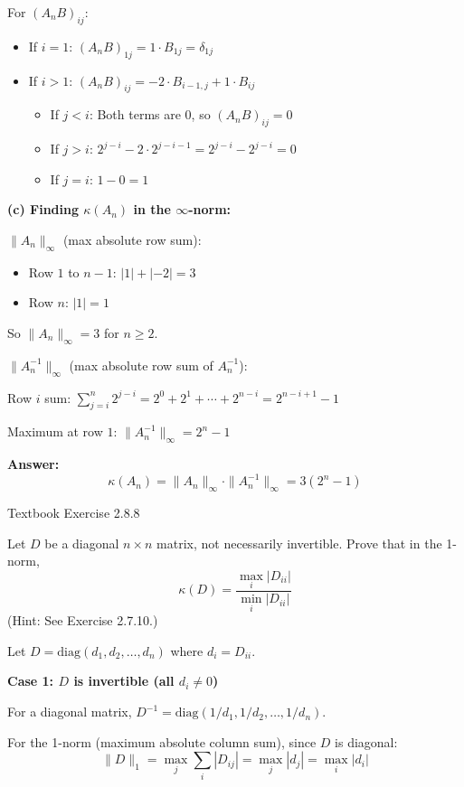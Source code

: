 \documentclass[reqno, answers]{exam}
\begin{document}
\begin{questions}
\begin{solution}
For $(A_n B)_{ij}$:
\begin{itemize}
    \item If $i = 1$: $(A_n B)_{1j} = 1 \cdot B_{1j} = \delta_{1j}$ \checkmark
    \item If $i > 1$: $(A_n B)_{ij} = -2 \cdot B_{i-1,j} + 1 \cdot B_{ij}$
    \begin{itemize}
        \item If $j < i$: Both terms are 0, so $(A_n B)_{ij} = 0$ \checkmark
        \item If $j > i$: $2^{j-i} - 2 \cdot 2^{j-i-1} = 2^{j-i} - 2^{j-i} = 0$ \checkmark
        \item If $j = i$: $1 - 0 = 1$ \checkmark
    \end{itemize}
\end{itemize}

\textbf{(c) Finding $\kappa(A_n)$ in the $\infty$-norm:}

$\|A_n\|_\infty$ (max absolute row sum):
\begin{itemize}
    \item Row $1$ to $n-1$: $|1| + |-2| = 3$
    \item Row $n$: $|1| = 1$
\end{itemize}

So $\|A_n\|_\infty = 3$ for $n \geq 2$.

$\|A_n^{-1}\|_\infty$ (max absolute row sum of $A_n^{-1}$):

Row $i$ sum: $\sum_{j=i}^{n} 2^{j-i} = 2^0 + 2^1 + \cdots + 2^{n-i} = 2^{n-i+1} - 1$

Maximum at row $1$: $\|A_n^{-1}\|_\infty = 2^n - 1$

\textbf{Answer:} 
\[
\boxed{\kappa(A_n) = \|A_n\|_\infty \cdot \|A_n^{-1}\|_\infty = 3(2^n - 1)}
\]
\end{solution}

\question Textbook Exercise 2.8.8

Let $D$ be a diagonal $n \times n$ matrix, not necessarily invertible. Prove that in the 1-norm,
\[
\kappa(D) = \frac{\max_i |D_{ii}|}{\min_i |D_{ii}|}
\]
(Hint: See Exercise 2.7.10.)

\begin{solution}
Let $D = \text{diag}(d_1, d_2, \ldots, d_n)$ where $d_i = D_{ii}$.

\textbf{Case 1: $D$ is invertible (all $d_i \neq 0$)}

For a diagonal matrix, $D^{-1} = \text{diag}(1/d_1, 1/d_2, \ldots, 1/d_n)$.

For the 1-norm (maximum absolute column sum), since $D$ is diagonal:
\[
\|D\|_1 = \max_j \sum_i |D_{ij}| = \max_j |d_j| = \max_i |d_i|
\]


\end{solution}
\end{questions}
\end{document}
